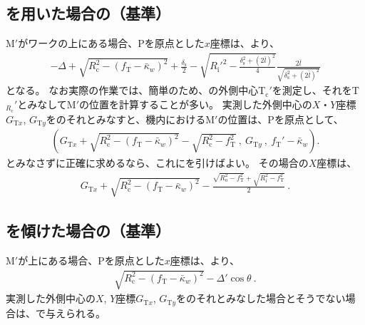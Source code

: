 \subsection{\Spacer を用いた場合の\KeywayCenter（\CurvatureCenter 基準）}
\KeywayCenter M$'$がワークの\CenterCurvatureLine 上にある場合、\TableCenter Pを原点とした$x$座標は、より、
\begin{align*}
  -\Delta+\sqrt{R_\mathrm c^2-(f_\mathrm T-\bar\kappa_w)^2}+\frac{\delta_\mathrm s}2
  -\sqrt{R_\mathrm i'^2-\frac{\delta_\mathrm s^2+(2\bar l)^2}4}\frac{2\bar l}{\sqrt{\delta_\mathrm s^2+\left(2\bar l\right)^2}}
\end{align*}
となる。
なお実際の作業では、簡単のため、\TopEndFace の外側中心T$_\mathrm c'$を測定し、それを\TopCurvatureCenter T$_{R_\mathrm c}'$とみなして\KeywayCenter M$'$の位置を計算することが多い。
実測した外側中心の$X$・$Y$座標$G_{\mathrm Tx}$, $G_{\mathrm Ty}$を\TopCurvatureCenter のそれとみなすと、機内における\KeywayCenter M$'$の位置は、\TableCenter Pを原点として、
\begin{align*}
  \left(
    G_{\mathrm Tx}
    +\sqrt{R_\mathrm c^2-(f_\mathrm T-\bar\kappa_w)^2}
    -\sqrt{R_\mathrm c^2-f_\mathrm T^2}\ ,\
    G_{\mathrm Ty}~,~
    f_\mathrm T'-\bar\kappa_w
  \right).
\end{align*}
\TopCurvatureCenter とみなさずに正確に求めるなら、これにを引けばよい。
その場合の$X$座標は、
\begin{align}
  \label{eq:Mreal}
  G_{\mathrm Tx}
  +\sqrt{R_\mathrm c^2-(f_\mathrm T-\bar\kappa_w)^2}
  -\frac{\sqrt{R_\mathrm o^2-f_\mathrm T^2}+\sqrt{R_\mathrm i^2-f_\mathrm T^2}}2\ .
\end{align}


\subsection{\Table を傾けた場合の\KeywayCenter（\CurvatureCenter 基準）}
\KeywayCenter M$'$が\CenterCurvatureLine 上にある場合、\TableCenter Pを原点とした$x$座標は、より、
\begin{align*}
  \sqrt{R_\mathrm c^2-(f_\mathrm T-\bar\kappa_w)^2}
  -\Delta'\cos\theta\ .
\end{align*}
実測した外側中心の$X$, $Y$座標$G_{\mathrm Tx}$, $G_{\mathrm Ty}$を\TopCurvatureCenter のそれとみなした場合とそうでない場合は、で与えられる。



